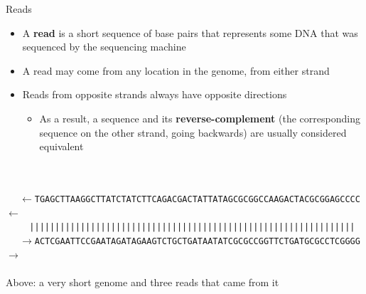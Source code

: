 \documentclass[xcolor=dvipsnames]{beamer}
\begin{document}
\begin{frame}{Reads}
    \begin{itemize}
        \item A {\bf read} is a short sequence of base pairs that represents
        some DNA that was sequenced by the sequencing machine
        \item A read may come from any location in the genome, from either
        strand
        \item Reads from opposite strands always have opposite directions
            \begin{itemize}
                \item As a result, a sequence and its {\bf reverse-complement}
                (the corresponding sequence on the other strand, going
                backwards) are usually considered equivalent
            \end{itemize}
    \end{itemize}
        {\scriptsize
            {\tt \ \ }
            \\
            {\tt \ \ }
            \\
            {\tt \ \ }
            {\tt $\leftarrow$TGAGCTTAAGGCTTATCTATCTTCAGACGACTATTATAGCGCGGCCAAGACTACGCGGAGCCCC$\leftarrow$} \\
            \vspace{-0.1cm}
            {\tt \ \ \ \ } {\tt |||||||||||||||||||||||||||||||||||||||||||||||||||||||||||||||| } \\
            \vspace{-0.1cm}
            {\tt \ \ }
            {\tt $\rightarrow$ACTCGAATTCCGAATAGATAGAAGTCTGCTGATAATATCGCGCCGGTTCTGATGCGCCTCGGGG$\rightarrow$} \\
            \vspace{-0.16cm}
            {\tt \ \ } 
            \vspace{0.5cm}
        }
        \\
        {Above: a very short genome and three reads that came from it}
\end{frame}
\end{document}
